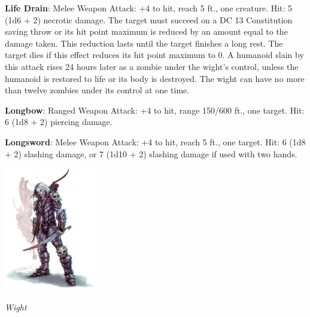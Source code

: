 \noindent\textbf{Life Drain}:  Melee Weapon Attack: +4 to hit, reach 5 ft., one creature. Hit: 5 (1d6 + 2) necrotic damage. The target must succeed on a DC 13 Constitution saving throw or its hit point maximum is reduced by an amount equal to the damage taken. This reduction lasts until the target finishes a long rest. The target dies if this effect reduces its hit point maximum to 0. A humanoid slain by this attack rises 24 hours later as a zombie under the wight's control, unless the humanoid is restored to life or its body is destroyed. The wight can have no more than twelve zombies under its control at one time.

\noindent\textbf{Longbow}: Ranged Weapon Attack: +4 to hit, range 150/600 ft., one target. Hit: 6 (1d8 + 2) piercing damage.

\noindent\textbf{Longsword}:  Melee Weapon Attack: +4 to hit, reach 5 ft., one target. Hit: 6 (1d8 + 2) slashing damage, or 7 (1d10 + 2) slashing damage if used with two hands.

\begin{center}
	\includegraphics[width = 0.3\textwidth]{wight}
	
	\emph{Wight}
\end{center}